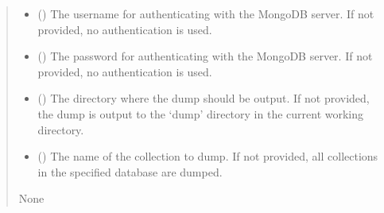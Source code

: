 \documentclass[letterpaper,10pt,english]{sphinxmanual}
\begin{document}
\begin{fulllineitems}
\begin{quote}
\begin{description}
\begin{itemize}
\item {} 
\sphinxAtStartPar
{} (\sphinxstyleliteralemphasis{\sphinxupquote{, }}) \textendash{} The username for authenticating with the MongoDB server. If not provided, no authentication
is used.

\item {} 
\sphinxAtStartPar
{} (\sphinxstyleliteralemphasis{\sphinxupquote{, }}) \textendash{} The password for authenticating with the MongoDB server. If not provided, no authentication
is used.

\item {} 
\sphinxAtStartPar
{} (\sphinxstyleliteralemphasis{\sphinxupquote{, }}) \textendash{} The directory where the dump should be output. If not provided, the dump is output to the
‘dump’ directory in the current working directory.

\item {} 
\sphinxAtStartPar
{} (\sphinxstyleliteralemphasis{\sphinxupquote{, }}) \textendash{} The name of the collection to dump. If not provided, all collections in the specified
database are dumped.

\end{itemize}

\sphinxAtStartPar
None

\end{description}\end{quote}

\end{fulllineitems}

\end{document}
